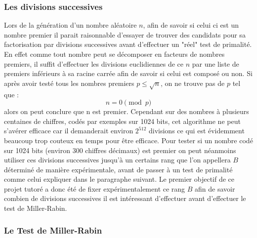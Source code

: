 \documentclass[a4paper,11pt]{article}
\begin{document}
\subsubsection{Les divisions successives}
Lors de la génération d'un nombre aléatoire $n$, afin de savoir si celui ci est un nombre premier il parait raisonnable d'essayer de trouver des candidats pour sa factorisation par divisions successives avant d'effectuer un "réel" test de primalité. En effet comme tout nombre peut se décomposer en facteurs de nombres premiers, il suffit d'effectuer les divisions euclidiennes de ce $n$ par une liste de premiers inférieurs à sa racine carrée afin de savoir si celui est composé ou non. Si après avoir testé tous les nombres premiers  $ p \leq \sqrt{n}$, on ne trouve pas de $p$ tel que : $$n=0\pmod{p}$$ alors on peut conclure que n est premier. Cependant sur des nombres à plusieurs centaines de chiffres, codés par exemples sur 1024 bits, cet algorithme ne peut s'avérer efficace car il demanderait environ $ 2^{512} $ divisions ce qui est évidemment beaucoup trop couteux en temps pour être efficace. 
Pour tester si un nombre codé sur 1024 bits (environ 300 chiffres décimaux) est premier on peut néanmoins utiliser ces divisions successives jusqu'à un certains rang que l'on appellera $B$ déterminé de manière expérimentale, avant de passer à un test de primalité comme celui expliquer dans le paragraphe suivant. 
Le premier objectif de ce projet tutoré a donc été de fixer expérimentalement ce rang $B$ afin de savoir combien de divisions successives il est intéressant d'effectuer avant d'effectuer le test de Miller-Rabin.

\subsubsection{Le Test de Miller-Rabin}
\end{document}
